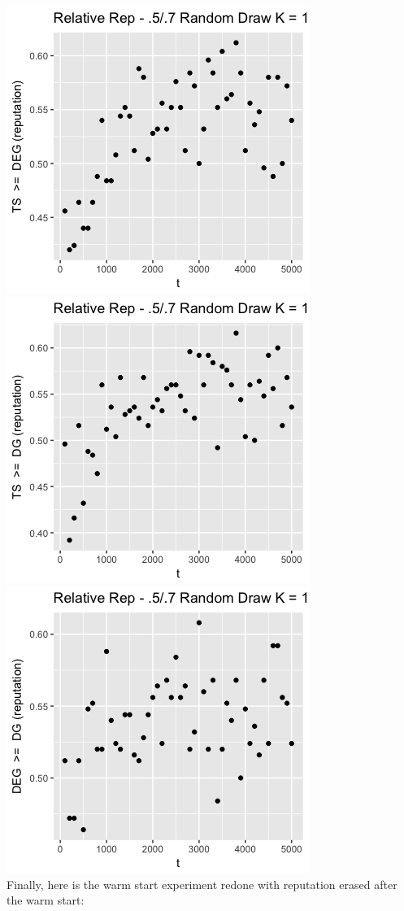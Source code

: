 \documentclass[11pt,letterpaper]{article}
\begin{document}
\includegraphics[scale=0.5]{ts_deg_5_7_10_prelim} \\
\includegraphics[scale=0.5]{ts_dg_5_7_10_prelim} \\
\includegraphics[scale=0.5]{deg_dg_5_7_10_prelim} \\

Finally, here is the warm start experiment redone with reputation erased after the warm start:


\end{document}

